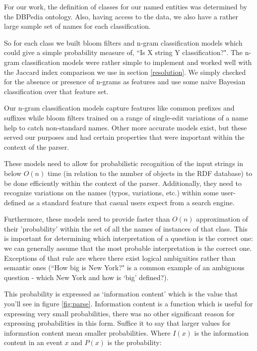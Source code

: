 \documentclass[11pt]{article}
\begin{document}
For our work, the definition of classes for our named entities was determined by the
DBPedia ontology. Also, having access to the data, we also have a rather large sample
set of names for each classification.

So for each class we built bloom filters\cite{bloom} and n-gram classification models 
which could give a simple probability measure of, ``Is X string Y classification?". 
The n-gram classification models were rather simple to implement and worked well 
with the Jaccard index comparison we use in section \ref{resolution}. We simply
checked for the absence or presence of n-grams as features and use some naive
Bayesian classification over that feature set.

Our n-gram classification models capture features like common prefixes and suffixes
while bloom filters trained on a range of single-edit variations of a name help
to catch non-standard names. Other more accurate models exist, but these served
our purposes and had certain properties that were important within the context
of the parser.

These models need to allow for probabilistic recognition of the input strings in 
below $O(n)$ time (in relation to the number of objects in the RDF
database) to be done efficiently within the context of the parser. 
Additionally, they need to recognize variations on
the names (typos, variations, etc.) within some user-defined as a standard feature
that casual users expect from a search engine.

Furthermore, these models need to provide faster than $O(n)$
approximation of their 'probability' within the set of all the names of instances
of that class. This is important for determining which interpretation of a
question is the correct one: we can generally assume that the most probable
interpretation is the correct one. Exceptions of that rule are where there exist
logical ambiguities rather than semantic ones (``How big is New York?" is a common example
of an ambiguous question - which New York and how is `big' defined?). 

This probability is expressed as `information content'\cite{shannon} which is
the value that you'll see in figure \ref{fig:parse}. 
Information content is a function which is useful for expressing very small 
probabilities, there was no other significant reason for expressing
probabilities in this form. Suffice it to say that larger values for information content
mean smaller probabilities. Where $I(x)$ is the information content in an event
$x$ and $P(x)$ is the probability:
\end{document}
